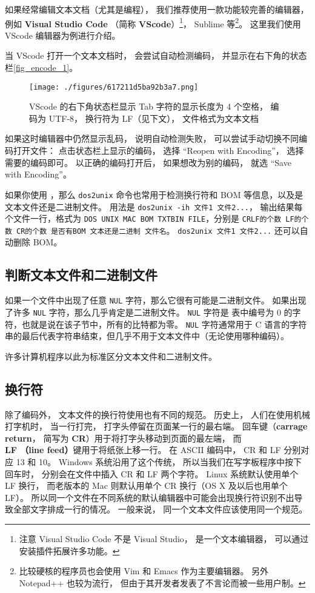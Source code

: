 如果经常编辑文本文档（尤其是编程）， 我们推荐使用一款功能较完善的编辑器， 例如 \textbf{Visual Studio Code} （简称 \textbf{VScode}）\footnote{注意 Visual Studio Code 不是 Visual Studio， 是一个文本编辑器， 可以通过安装插件拓展许多功能。}， Sublime 等\footnote{比较硬核的程序员也会使用 Vim 和 Emacs 作为主要编辑器。 另外 Notepad++ 也较为流行， 但由于其开发者发表了不言论而被一些用户制。}。 这里我们使用 VScode 编辑器为例进行介绍。

当 VScode 打开一个文本文档时， 会尝试自动检测编码， 并显示在右下角的状态栏\autoref{fig_encode_1}。
\begin{figure}[ht]
\centering
\texttt{[image: ./figures/617211d5ba92b3a7.png]}
\caption{VScode 的右下角状态栏显示 Tab 字符的显示长度为 4 个空格， 编码为 UTF-8， 换行符为 LF（见下文）， 文件格式为文本文档} \label{fig_encode_1}
\end{figure}
如果这时编辑器中仍然显示乱码， 说明自动检测失败， 可以尝试手动切换不同编码打开文件： 点击状态栏上显示的编码， 选择 “Reopen with Encoding”， 选择需要的编码即可。 以正确的编码打开后， 如果想改为别的编码， 就选 “Save with Encoding”。

如果你使用 ，那么 \verb`dos2unix` 命令也常用于检测换行符和 BOM 等信息，以及是文本文件还是二进制文件。 用法是 \verb`dos2unix -ih 文件1 文件2...`， 输出结果每个文件一行，格式为 \verb`DOS UNIX MAC BOM TXTBIN FILE`，分别是 \verb`CRLF的个数 LF的个数 CR的个数 是否有BOM 文本还是二进制 文件名`。 \verb`dos2unix 文件1 文件2...` 还可以自动删除 BOM。

\subsection{判断文本文件和二进制文件}
如果一个文件中出现了任意 \verb`NUL` 字符，那么它很有可能是二进制文件。 如果出现了许多 \verb`NUL` 字符，那么几乎肯定是二进制文件。 \verb`NUL` 字符是  表中编号为 0 的字符，也就是说在该子节中，所有的比特都为零。 \verb`NUL` 字符通常用于 C 语言的字符串的最后代表字符串结束，但几乎不用于文本文件中（无论使用哪种编码）。

许多计算机程序以此为标准区分文本文件和二进制文件。

\subsection{换行符}\label{sub_encode_1}
除了编码外， 文本文件的换行符使用也有不同的规范。 历史上， 人们在使用机械打字机时， 当一行打完， 打字头停留在页面某一行的最右端。 回车键（\textbf{carrage return}， 简写为 \textbf{CR}）用于将打字头移动到页面的最左端， 而 \textbf{LF （line feed）}键用于将纸张上移一行。 在 ASCII 编码中， CR 和 LF 分别对应 13 和 10。 Windows 系统沿用了这个传统， 所以当我们在写字板程序中按下回车时， 分别会在文件中插入 CR 和 LF 两个字符。 Linux 系统默认使用单个 LF 换行， 而老版本的 Mac 则默认用单个 CR 换行（OS X 及以后也用单个 LF）。 所以同一个文件在不同系统的默认编辑器中可能会出现换行符识别不出导致全部文字排成一行的情况。 一般来说， 同一个文本文件应该使用同一个规范。

